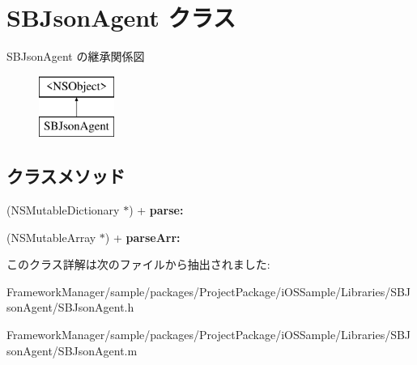 \hypertarget{interface_s_b_json_agent}{}\section{S\+B\+Json\+Agent クラス}
\label{interface_s_b_json_agent}
S\+B\+Json\+Agent の継承関係図\begin{figure}[H]
\begin{center}
\leavevmode
\includegraphics[height=2.000000cm]{interface_s_b_json_agent}
\end{center}
\end{figure}
\subsection*{クラスメソッド}
\begin{DoxyCompactItemize}
\item 
\hypertarget{interface_s_b_json_agent_ae8bb42eb37516f5443d9f0589cff80e9}{}(N\+S\+Mutable\+Dictionary $\ast$) + {\bfseries parse\+:}\label{interface_s_b_json_agent_ae8bb42eb37516f5443d9f0589cff80e9}

\item 
\hypertarget{interface_s_b_json_agent_ad050416717e43b6b3fb9ed2207e6e06f}{}(N\+S\+Mutable\+Array $\ast$) + {\bfseries parse\+Arr\+:}\label{interface_s_b_json_agent_ad050416717e43b6b3fb9ed2207e6e06f}

\end{DoxyCompactItemize}


このクラス詳解は次のファイルから抽出されました\+:\begin{DoxyCompactItemize}
\item 
Framework\+Manager/sample/packages/\+Project\+Package/i\+O\+S\+Sample/\+Libraries/\+S\+B\+Json\+Agent/S\+B\+Json\+Agent.\+h\item 
Framework\+Manager/sample/packages/\+Project\+Package/i\+O\+S\+Sample/\+Libraries/\+S\+B\+Json\+Agent/S\+B\+Json\+Agent.\+m\end{DoxyCompactItemize}
